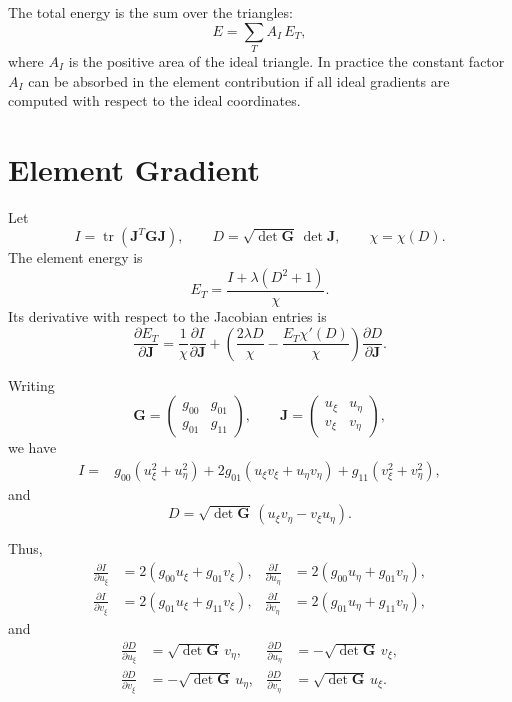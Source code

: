 \documentclass[11pt]{article}
\newcommand{\bG}{\bm{G}}
\newcommand{\bJ}{\bm{J}}
\begin{document}
The total energy is the sum over the triangles:
\[
  E = \sum_{T} A_I\,E_T,
\]
where \(A_I\) is the positive area of the ideal triangle. In practice the
constant factor \(A_I\) can be absorbed in the element contribution if all
ideal gradients are computed with respect to the ideal coordinates.

\section{Element Gradient}

Let
\[
  I = \operatorname{tr}\left(\bJ^T \bG \bJ\right),
  \qquad
  D = \sqrt{\det \bG}\,\det \bJ,
  \qquad
  \chi = \chi(D).
\]
The element energy is
\[
  E_T = \frac{I + \lambda(D^2+1)}{\chi}.
\]
Its derivative with respect to the Jacobian entries is
\[
  \frac{\partial E_T}{\partial \bJ}
  =
  \frac{1}{\chi}
  \frac{\partial I}{\partial \bJ}
  +
  \left(
    \frac{2\lambda D}{\chi}
    -
    \frac{E_T \chi'(D)}{\chi}
  \right)
  \frac{\partial D}{\partial \bJ}.
\]

Writing
\[
  \bG =
  \begin{pmatrix}
    g_{00} & g_{01} \\
    g_{01} & g_{11}
  \end{pmatrix},
  \qquad
  \bJ =
  \begin{pmatrix}
    u_\xi & u_\eta \\
    v_\xi & v_\eta
  \end{pmatrix},
\]
we have
\[
\begin{aligned}
  I ={}&
  g_{00}(u_\xi^2 + u_\eta^2)
  + 2g_{01}(u_\xi v_\xi + u_\eta v_\eta)
  + g_{11}(v_\xi^2 + v_\eta^2),
\end{aligned}
\]
and
\[
  D = \sqrt{\det \bG}\,(u_\xi v_\eta - v_\xi u_\eta).
\]

Thus,
\[
\begin{aligned}
  \frac{\partial I}{\partial u_\xi}
  &= 2(g_{00}u_\xi + g_{01}v_\xi),
&
  \frac{\partial I}{\partial u_\eta}
  &= 2(g_{00}u_\eta + g_{01}v_\eta),\\
  \frac{\partial I}{\partial v_\xi}
  &= 2(g_{01}u_\xi + g_{11}v_\xi),
&
  \frac{\partial I}{\partial v_\eta}
  &= 2(g_{01}u_\eta + g_{11}v_\eta),
\end{aligned}
\]
and
\[
\begin{aligned}
  \frac{\partial D}{\partial u_\xi}
  &= \sqrt{\det \bG}\,v_\eta,
&
  \frac{\partial D}{\partial u_\eta}
  &= -\sqrt{\det \bG}\,v_\xi,\\
  \frac{\partial D}{\partial v_\xi}
  &= -\sqrt{\det \bG}\,u_\eta,
&
  \frac{\partial D}{\partial v_\eta}
  &= \sqrt{\det \bG}\,u_\xi.
\end{aligned}
\]
\end{document}
